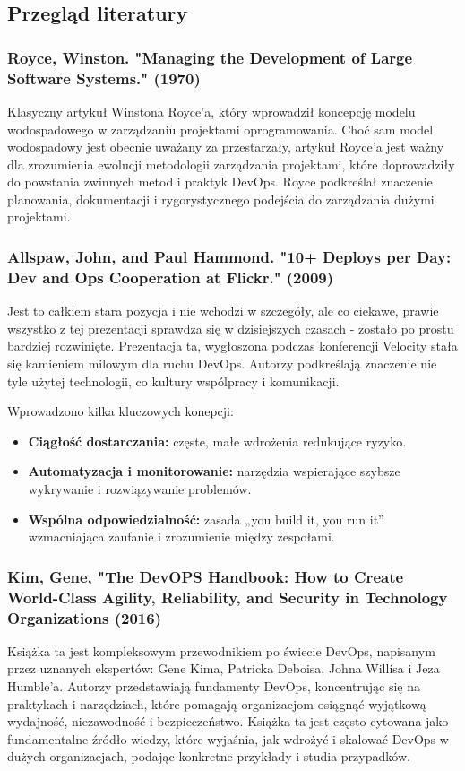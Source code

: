 \documentclass{article}
\begin{document}
\subsection{Przegląd literatury}

\subsubsection{Royce, Winston. "Managing the Development of Large Software Systems." (1970)\cite{royceWaterfall}} 

Klasyczny artykuł Winstona Royce'a, który wprowadził koncepcję modelu wodospadowego w zarządzaniu projektami oprogramowania. Choć sam model wodospadowy jest obecnie uważany za przestarzały, artykuł Royce'a jest ważny dla zrozumienia ewolucji metodologii zarządzania projektami, które doprowadziły do powstania zwinnych metod i praktyk DevOps. Royce podkreślał znaczenie planowania, dokumentacji i rygorystycznego podejścia do zarządzania dużymi projektami.

\subsubsection{Allspaw, John, and Paul Hammond. "10+ Deploys per Day: Dev and Ops Cooperation at Flickr." (2009)\cite{flickr}}
Jest to całkiem stara pozycja i nie wchodzi w szczegóły, ale co ciekawe, prawie wszystko z tej prezentacji sprawdza się w dzisiejszych czasach - zostało po prostu bardziej rozwinięte. Prezentacja ta, wygłoszona podczas konferencji Velocity stała się kamieniem milowym dla ruchu DevOps. Autorzy podkreślają znaczenie nie tyle użytej technologii, co kultury wspólpracy i komunikacji.

Wprowadzono kilka kluczowych konepcji:
\begin{itemize}
    \item \textbf{Ciągłość dostarczania:} częste, małe wdrożenia redukujące ryzyko.
    \item \textbf{Automatyzacja i monitorowanie:} narzędzia wspierające szybsze wykrywanie i rozwiązywanie problemów.
    \item \textbf{Wspólna odpowiedzialność:} zasada „you build it, you run it” wzmacniająca zaufanie i zrozumienie między zespołami.
\end{itemize}

\subsubsection{Kim, Gene, "The DevOPS Handbook: How to Create World-Class Agility, Reliability, and Security in Technology Organizations (2016)\cite{devOpsHandbook}}
Książka ta jest kompleksowym przewodnikiem po świecie DevOps, napisanym przez uznanych ekspertów: Gene Kima, Patricka Deboisa, Johna Willisa i Jeza Humble'a. Autorzy przedstawiają fundamenty DevOps, koncentrując się na praktykach i narzędziach, które pomagają organizacjom osiągnąć wyjątkową wydajność, niezawodność i bezpieczeństwo. Książka ta jest często cytowana jako fundamentalne źródło wiedzy, które wyjaśnia, jak wdrożyć i skalować DevOps w dużych organizacjach, podając konkretne przykłady i studia przypadków.
\end{document}
